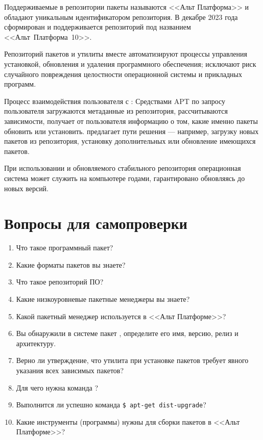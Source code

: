 Поддерживаемые в  репозитории пакеты называются <<Альт Платформа>> и обладают уникальным идентификатором
репозитория. В декабре 2023 года сформирован и поддерживается репозиторий  под названием <<Альт~Платформа~10>>.

Репозиторий пакетов и утилиты  вместе автоматизируют процессы управления установкой, обновления и удаления
программного обеспечения; исключают риск случайного повреждения целостности операционной системы и прикладных
программ.

Процесс взаимодействия пользователя с : Средствами APT по запросу пользователя загружаются метаданные
из репозитория, рассчитываются зависимости,  получает от пользователя информацию о том,
какие именно пакеты обновить или установить.  предлагает пути решения --- например, загрузку
новых пакетов из репозитория, установку дополнительных или обновление имеющихся пакетов.


При использовании  и обновляемого стабильного репозитория операционная система может
служить на компьютере годами, гарантировано обновляясь до новых версий.

\section{Вопросы для самопроверки}

\begin{enumerate}
	\item Что такое программный пакет?
	\item Какие форматы пакетов вы знаете?
	\item Что такое репозиторий ПО?
	\item Какие низкоуровневые пакетные менеджеры вы знаете?
	\item Какой пакетный менеджер используется в <<Альт Платформе>>?
	\item Вы обнаружили в системе пакет , определите его имя, версию, релиз и архитектуру.
	\item Верно ли утверждение, что утилита  при установке пакетов требует явного указания всех зависимых пакетов?
	\item Для чего нужна команда ?
	\item Выполнится ли успешно команда \verb!$ apt-get dist-upgrade!?
	\item Какие инструменты (программы) нужны для сборки пакетов в <<Альт Платформе>>?
\end{enumerate}
